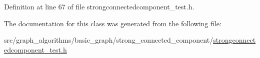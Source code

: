 Definition at line 67 of file strongconnectedcomponent\+\_\+test.\+h.



The documentation for this class was generated from the following file\+:\begin{DoxyCompactItemize}
\item 
src/graph\+\_\+algorithms/basic\+\_\+graph/strong\+\_\+connected\+\_\+component/\hyperlink{strongconnectedcomponent__test_8h}{strongconnectedcomponent\+\_\+test.\+h}\end{DoxyCompactItemize}
